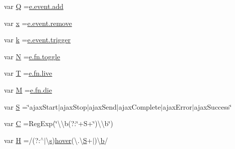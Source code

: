 \begin{DoxyCompactItemize}
\item 
var \hyperlink{jquery-migrate-1_82_81_8min_8js_a044ff3ae9eca11d4603780243cdfc911}{Q} =\hyperlink{jquery-migrate-1_82_81_8min_8js_adfc2a3f1403063f39278226a02571631}{e.\-event.\-add}
\item 
var \hyperlink{jquery-migrate-1_82_81_8min_8js_a81e910173af87b1161e719a504d52407}{x} =\hyperlink{jquery-migrate-1_82_81_8min_8js_a4a5dfe91371a8a51afa69bcd5fddaac3}{e.\-event.\-remove}
\item 
var \hyperlink{jquery-migrate-1_82_81_8min_8js_ab26645c014aa005ecedef329ecf58c99}{k} =\hyperlink{jquery-migrate-1_82_81_8min_8js_a239df7e8c2edd1a4de69f6e2752cf667}{e.\-event.\-trigger}
\item 
var \hyperlink{jquery-migrate-1_82_81_8min_8js_abadc8a6494eb0561422367930ee2c126}{N} =\hyperlink{static_2root_2js_2bootstrap_2bootstrap_8min_8js_acf7cf7d86a171d1c082d8bf08f2de490}{e.\-fn.\-toggle}
\item 
var \hyperlink{jquery-migrate-1_82_81_8min_8js_aa798e0c32253f973f3154aa30c996eb2}{T} =\hyperlink{jquery-migrate-1_82_81_8min_8js_aa6c79bc1b67b68a78848ce440dbedd68}{e.\-fn.\-live}
\item 
var \hyperlink{jquery-migrate-1_82_81_8min_8js_af33e4fb80081524297d84c89540aeaca}{M} =\hyperlink{jquery-migrate-1_82_81_8min_8js_a8000af92246746444c1d08e9650d86af}{e.\-fn.\-die}
\item 
var \hyperlink{jquery-migrate-1_82_81_8min_8js_a8bab16140cede5f71c657e8dc46c1887}{S} =\char`\"{}ajax\-Start$\vert$ajax\-Stop$\vert$ajax\-Send$\vert$ajax\-Complete$\vert$ajax\-Error$\vert$ajax\-Success\char`\"{}
\item 
var \hyperlink{jquery-migrate-1_82_81_8min_8js_ae59e0ac8d0c43c81f50236f719763efc}{C} =Reg\-Exp(\char`\"{}\textbackslash{}\textbackslash{}b(?\-:\char`\"{}+S+\char`\"{})\textbackslash{}\textbackslash{}b\char`\"{})
\item 
var \hyperlink{jquery-migrate-1_82_81_8min_8js_abd057520df7a5dc64fe29b4edd3166a3}{H} =/(?\-:$^\wedge$$\vert$\textbackslash{}\hyperlink{static_2root_2js_2jquery-ui_8custom_8min_8js_a387623556fbc0ba947c5babd49e10aaa}{s})\hyperlink{static_2root_2js_2global_8js_abbda72fd741285829c842f0a29d2ba10}{hover}(\textbackslash{}.\textbackslash{}\hyperlink{jquery-migrate-1_82_81_8min_8js_a8bab16140cede5f71c657e8dc46c1887}{S}+$\vert$)\textbackslash{}\hyperlink{quill_8min_8js_ae02349c58306210e3fd20abc63482e9a}{b}/
\item 
$$
\end{DoxyCompactItemize}

